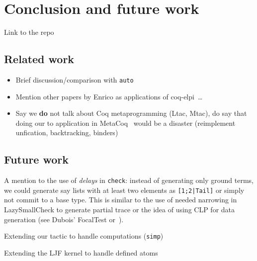 \section{Conclusion and future work}

Link to the repo
\subsection{Related work}
\label{ssec:rel}

\begin{itemize}
\item Brief discussion/comparison with \texttt{auto}
\item Mention other papers by Enrico as applications of coq-elpi~\cite{coen19mscs,tassi19itp}\dots
\item Say we \textbf{do} not talk about Coq metaprogramming (Ltac, Mtac), do say that doing our to application in MetaCoq~\cite{sozeau2020metacoq} would be a disaster (reimplement unfication, backtracking, binders)
\end{itemize}

\subsection{Future work}
\label{ssec:fut}


A mention to the use of \emph{delays} in \texttt{check}: instead of generating only ground terms, we could generate say lists with at least two elements as \texttt{[1;2|Tail]} or simply not commit to a base type. This  is similar to the use of needed narrowing in LazySmallCheck to generate partial trace or the idea of using CLP for data generation (see Dubois' FocalTest or~\cite{FioravantiPS15}).

Extending our tactic to handle computations (\texttt{simp})

Extending the LJF kernel to handle defined atoms
